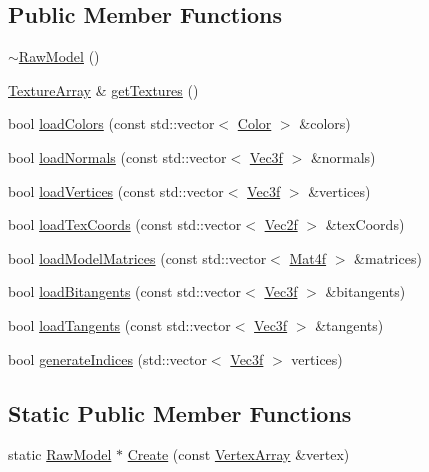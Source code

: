 \subsection*{Public Member Functions}
\begin{DoxyCompactItemize}
\item 
\hyperlink{classpcs_1_1RawModel_a3fb7c140b100311f737d23dfb9fbf6d6}{$\sim$\+Raw\+Model} ()
\item 
\hyperlink{unionpcs_1_1TextureArray}{Texture\+Array} \& \hyperlink{classpcs_1_1RawModel_a3caaf1aa1419660fcd4c33807eb96782}{get\+Textures} ()
\item 
bool \hyperlink{classpcs_1_1RawModel_aae953c9150aae7571ac4d6eba5c33305}{load\+Colors} (const std\+::vector$<$ \hyperlink{structpcs_1_1Color}{Color} $>$ \&colors)
\item 
bool \hyperlink{classpcs_1_1RawModel_a5271416a4170cf08bd5350749d685b7c}{load\+Normals} (const std\+::vector$<$ \hyperlink{namespacepcs_a68e0f517680976c17c810ffe6952cbab}{Vec3f} $>$ \&normals)
\item 
bool \hyperlink{classpcs_1_1RawModel_a5374bbadf5f2a6e19304a1a89ca8e54d}{load\+Vertices} (const std\+::vector$<$ \hyperlink{namespacepcs_a68e0f517680976c17c810ffe6952cbab}{Vec3f} $>$ \&vertices)
\item 
bool \hyperlink{classpcs_1_1RawModel_acac5d3775fec41de4df5ba961b32d18c}{load\+Tex\+Coords} (const std\+::vector$<$ \hyperlink{namespacepcs_a4b2fd718bd0800b6aa492b1c60f19edc}{Vec2f} $>$ \&tex\+Coords)
\item 
bool \hyperlink{classpcs_1_1RawModel_adb1d28808d43a29209414e1b0ee56022}{load\+Model\+Matrices} (const std\+::vector$<$ \hyperlink{structpcs_1_1Mat4f}{Mat4f} $>$ \&matrices)
\item 
bool \hyperlink{classpcs_1_1RawModel_aa4798a4d19458fdb4aedeed0be9c02a1}{load\+Bitangents} (const std\+::vector$<$ \hyperlink{namespacepcs_a68e0f517680976c17c810ffe6952cbab}{Vec3f} $>$ \&bitangents)
\item 
bool \hyperlink{classpcs_1_1RawModel_a85196296fb104770053b215548c6341e}{load\+Tangents} (const std\+::vector$<$ \hyperlink{namespacepcs_a68e0f517680976c17c810ffe6952cbab}{Vec3f} $>$ \&tangents)
\item 
bool \hyperlink{classpcs_1_1RawModel_a147fb1b196e18e2f2deb1a6e86fff9b6}{generate\+Indices} (std\+::vector$<$ \hyperlink{namespacepcs_a68e0f517680976c17c810ffe6952cbab}{Vec3f} $>$ vertices)
\end{DoxyCompactItemize}
\subsection*{Static Public Member Functions}
\begin{DoxyCompactItemize}
\item 
static \hyperlink{classpcs_1_1RawModel}{Raw\+Model} $\ast$ \hyperlink{classpcs_1_1RawModel_ac01c81a6c26c802f17a65f6c81147206}{Create} (const \hyperlink{classpcs_1_1VertexArray}{Vertex\+Array} \&vertex)
\end{DoxyCompactItemize}
